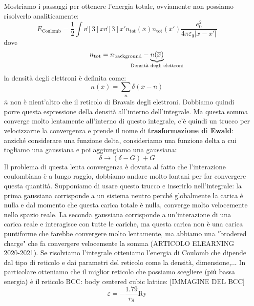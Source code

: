 Mostriamo i passaggi per ottenere l'energia totale, ovviamente non possiamo risolverlo analiticamente:
\begin{equation*}
    E_{\text{Coulomb}}=\frac 12 \int \dd[3]{x}\dd[3]{x'}n_{\text{tot}}(\overline x)n_{\text{tot}}(\overline{x}')\frac{e_0^2}{4\pi\varepsilon_0|\overline{x}-\overline{x}'|}
\end{equation*}
dove
\begin{equation*}
    n_{\text{tot}}=n_{\text{background}}-\underbrace{n(\overline x)}_{\mathclap{\text{Densità degli elettroni}}}
\end{equation*}
la densità degli elettroni è definita come:
\begin{equation*}
    n(\overline x)=\sum_{\overline n}\delta(\overline x-\overline n)
\end{equation*}
$\overline n$ non è nient'altro che il reticolo di Bravais degli elettroni. Dobbiamo quindi porre questa espressione della densità all'interno dell'integrale. Ma questa somma converge molto lentamente all'interno di questo integrale, c'è quindi un trucco per velocizzarne la convergenza e prende il nome di \textbf{trasformazione di Ewald}: anziché considerare una funzione delta, consideriamo una funzione delta a cui togliamo una gaussiana e poi aggiungiamo una gaussiana:
\begin{equation*}
    \delta \rightarrow (\delta-G)+G
\end{equation*}
Il problema di questa lenta convergenza è dovuta al fatto che l'interazione coulombiana è a lungo raggio, dobbiamo andare molto lontani per far convergere questa quantità. Supponiamo di usare questo trucco e inserirlo nell'integrale: la prima gaussiana corrisponde a un sistema neutro perché globalmente la carica è nulla e dal momento che questa carica totale è nulla, converge molto velocemente nello spazio reale. La seconda gaussiana corrisponde a un'interazione di una carica reale e interagisce con tutte le cariche, ma questa carica non è una carica puntiforme che farebbe convergere molto lentamente, ma abbiamo una "brodered charge" che fa convergere velocemente la somma (ARTICOLO ELEARNING 2020-2021).
Se risolviamo l'integrale otteniamo l'energia di Coulomb che dipende dal tipo di reticolo e dai parametri del reticolo come la densità, dimensione,... In particolare otteniamo che il miglior reticolo che possiamo scegliere (più bassa energia) è il reticolo BCC: body centered cubic lattice:
[IMMAGINE DEL BCC]
\begin{equation*}
    \varepsilon=-\frac{1.79}{r_\text{S}}\text{Ry}
\end{equation*}
